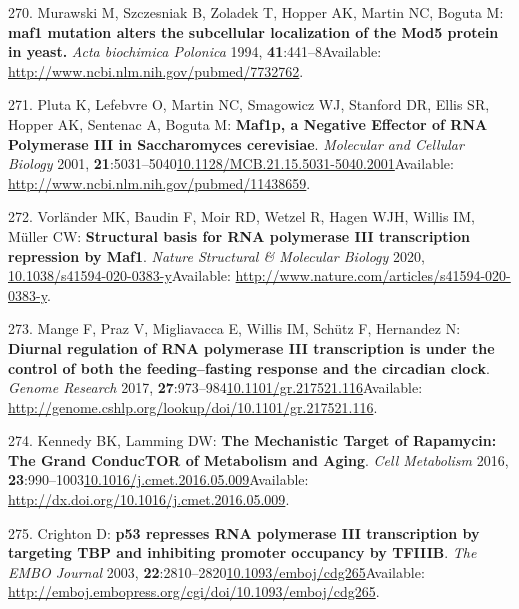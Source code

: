 \documentclass[
]{book}
\begin{document}
\leavevmode\hypertarget{ref-Murawski1994}{}%
270. Murawski M, Szczesniak B, Zoladek T, Hopper AK, Martin NC, Boguta M: \textbf{maf1 mutation alters the subcellular localization of the Mod5 protein in yeast.} \emph{Acta biochimica Polonica} 1994, \textbf{41}:441--8Available: \url{http://www.ncbi.nlm.nih.gov/pubmed/7732762}.

\leavevmode\hypertarget{ref-Pluta2001}{}%
271. Pluta K, Lefebvre O, Martin NC, Smagowicz WJ, Stanford DR, Ellis SR, Hopper AK, Sentenac A, Boguta M: \textbf{Maf1p, a Negative Effector of RNA Polymerase III in Saccharomyces cerevisiae}. \emph{Molecular and Cellular Biology} 2001, \textbf{21}:5031--5040\href{https://doi.org/10.1128/MCB.21.15.5031-5040.2001}{10.1128/MCB.21.15.5031-5040.2001}Available: \url{http://www.ncbi.nlm.nih.gov/pubmed/11438659}.

\leavevmode\hypertarget{ref-Vorlander2020}{}%
272. Vorländer MK, Baudin F, Moir RD, Wetzel R, Hagen WJH, Willis IM, Müller CW: \textbf{Structural basis for RNA polymerase III transcription repression by Maf1}. \emph{Nature Structural \& Molecular Biology} 2020, \href{https://doi.org/10.1038/s41594-020-0383-y}{10.1038/s41594-020-0383-y}Available: \url{http://www.nature.com/articles/s41594-020-0383-y}.

\leavevmode\hypertarget{ref-Mange2017}{}%
273. Mange F, Praz V, Migliavacca E, Willis IM, Schütz F, Hernandez N: \textbf{Diurnal regulation of RNA polymerase III transcription is under the control of both the feeding--fasting response and the circadian clock}. \emph{Genome Research} 2017, \textbf{27}:973--984\href{https://doi.org/10.1101/gr.217521.116}{10.1101/gr.217521.116}Available: \url{http://genome.cshlp.org/lookup/doi/10.1101/gr.217521.116}.

\leavevmode\hypertarget{ref-Kennedy2016}{}%
274. Kennedy BK, Lamming DW: \textbf{The Mechanistic Target of Rapamycin: The Grand ConducTOR of Metabolism and Aging}. \emph{Cell Metabolism} 2016, \textbf{23}:990--1003\href{https://doi.org/10.1016/j.cmet.2016.05.009}{10.1016/j.cmet.2016.05.009}Available: \url{http://dx.doi.org/10.1016/j.cmet.2016.05.009}.

\leavevmode\hypertarget{ref-Crighton2003}{}%
275. Crighton D: \textbf{p53 represses RNA polymerase III transcription by targeting TBP and inhibiting promoter occupancy by TFIIIB}. \emph{The EMBO Journal} 2003, \textbf{22}:2810--2820\href{https://doi.org/10.1093/emboj/cdg265}{10.1093/emboj/cdg265}Available: \url{http://emboj.embopress.org/cgi/doi/10.1093/emboj/cdg265}.
\end{document}
